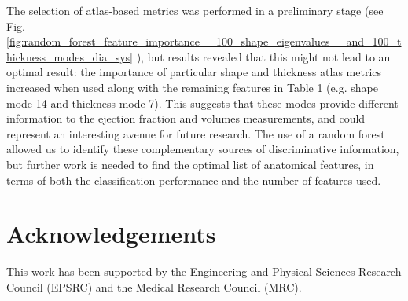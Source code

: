 \documentclass{llncs}
\begin{document}
The selection of atlas-based metrics was performed in a preliminary stage (see Fig. \ref{fig:random_forest_feature_importance__100_shape_eigenvalues__and_100_thickness_modes_dia_sys} ), but results revealed that this might not lead to an optimal result: the importance of particular shape and thickness atlas metrics increased when used along with the remaining features in Table 1 (e.g. shape mode 14 and thickness mode 7). This suggests that these modes provide different information to the ejection fraction and volumes measurements, and could represent an interesting avenue for future research. The use of a random forest allowed us to identify these complementary sources of discriminative information, but further work is needed to find the optimal list of anatomical features, in terms of both the classification performance and the number of features used.


\section{Acknowledgements}
This work has been supported by the Engineering and Physical Sciences Research Council (EPSRC) and the Medical Research Council (MRC).


\end{document}
